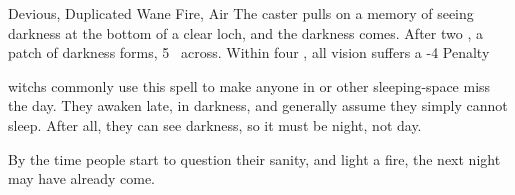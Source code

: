 \begin{multicols}{2}

  {Devious, Duplicated}%
  {Wane}%
  {Fire, Air}%
  {}%
  {The caster pulls on a memory of seeing darkness at the bottom of a clear loch, and the darkness comes.
  After two , a patch of darkness forms, 5~ across.
  Within four , all vision suffers a -4 Penalty}%
  {
  \Glspl{witch} commonly use this spell to make anyone in  or other sleeping-space miss the day.
  They awaken late, in darkness, and generally assume they simply cannot sleep.
  After all, they can see darkness, so it must be night, not day.

  By the time people start to question their sanity, and light a fire, the next night may have already come.
  }



\iftoggle{verbose}{}{

  \subsection{Force}

  \showSpells{Force1}

  \spell{Friendly Bolt}%
    {Duplicated}%
    {Wane}%
    {Earth, Fire}%
    {\gls{weight} carried}%
    {The caster shouts `let's go', and two targets gain a plus \arabic{spellPlusOne} bonus to running}%
    {They feel suddenly lighter, as if being carried.
    However, this spell does not help with carrying heavy items.}

  \spell{Migrating Butterfly}%
    {Detailed}%
    {Wane}%
    {Earth, Fire}%
    {\gls{weight} carried}%
    {The caster outright denies how heavy something is, despite obvious heft, and its \gls{weight} reduces by \arabic{spellPlusOne} when facing towards the direction the caster looks}%
    {Items which fall below \gls{weight}~0 will float like a seed on the wind}

  \spell{Traveller's Curse}%
    {Distant}%
    {Wax}%
    {Earth, Fire}%
    {\roll{Speed}{Athletics}}%
    {The caster wishes the target a bad journey, and they immediately feel heavier.
    For the next \arabic{spellPlusOne}~\glspl{interval}, the target counts as carrying something with \pgls{weight} of \arabic{spellPlusOne}}%
    {
    The curse wears off once the target has marched enough, but any \glspl{interval} the target spends stationary do not count towards the spell's duration.}

}
\end{multicols}
